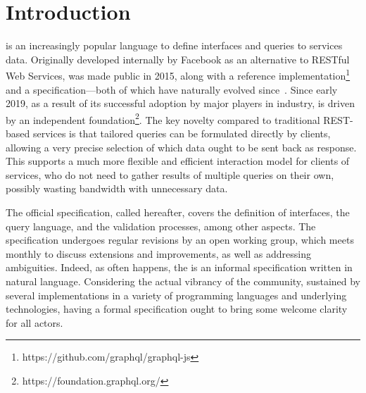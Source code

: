\section{Introduction}

\gql is an increasingly popular language to define interfaces and queries to services data. Originally developed internally by Facebook as an alternative to RESTful Web Services, \gql was made public in 2015, along with a reference implementation\footnote{https://github.com/graphql/graphql-js} and a specification---both of which have naturally evolved since~\cite{gqlspec}. %
Since early 2019, as a result of its successful adoption by major players in industry,
\gql is driven by an independent foundation\footnote{https://foundation.graphql.org/}. The key novelty compared to traditional REST-based services is that tailored queries can be formulated directly by clients, allowing a very precise selection of which data ought to be sent back as response. This supports a much more flexible and efficient interaction model for clients of services, who do not need to gather results of multiple queries on their own, possibly wasting bandwidth with unnecessary data.


The official \gql specification, called \spec hereafter, 
covers the definition of interfaces, the query language, and the validation processes, among other aspects. The specification undergoes regular revisions by an open working group, which meets monthly to discuss extensions and improvements, as well as addressing ambiguities. Indeed, as often happens, the \spec is an informal specification written in natural language.
Considering the actual vibrancy of the \gql community, sustained by several implementations in a variety of programming languages and underlying technologies, having a formal specification ought to bring some welcome clarity for all actors.

